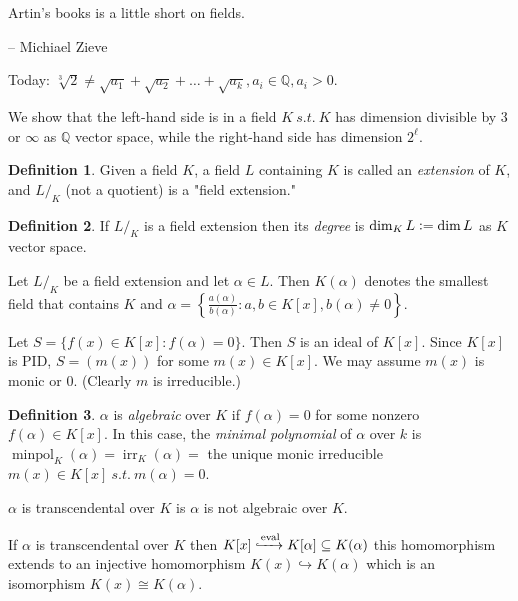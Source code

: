 \documentclass{article}
\newcommand{\Q}{\mathbb{Q}}
\newcommand{\st}{\ s.t.\ }
\newcommand{\defeq}{\vcentcolon=}
\theoremstyle{definition}
\newtheorem*{definition}{Definition}
\theoremstyle{remark}
\begin{document}

\epigraph{Artin's books is a little short on fields.}{-- \textup{Michiael Zieve}}

Today: $\sqrt[3]{2} \neq \sqrt{a_1} + \sqrt{a_2} + \ldots + \sqrt{a_k}, a_i \in \Q, a_i > 0$.

We show that the left-hand side is in a field $K \st K$ has dimension divisible by $3$ or $\infty$ as $\Q$ vector space, while the right-hand side has dimension $2^\ell$.

\begin{definition}
  Given a field $K$, a field $L$ containing $K$ is called an \emph{extension} of $K$, and $L/_K$ (not a quotient) is a "field extension."
\end{definition}

\begin{definition}
  If $L/_K$ is a field extension then its \emph{degree} is $\dim_KL \defeq \dim L$ as $K$ vector space.
\end{definition}

Let $L/_K$ be a field extension and let $\alpha \in L$. Then $K(\alpha)$ denotes the smallest field that contains $K$ and $\alpha = \left\lbrace \frac{a(\alpha)}{b(\alpha)}: a, b \in K[x], b(\alpha) \neq 0\right\rbrace$.

Let $S = \{f(x) \in K[x]: f(\alpha) = 0\}$. Then $S$ is an ideal of $K[x]$. Since $K[x]$ is PID, $S = (m(x))$ for some $m(x) \in K[x]$. We may assume $m(x)$ is monic or $0$. (Clearly $m$ is irreducible.)

\begin{definition}
  $\alpha$ is \emph{algebraic} over $K$ if $f(\alpha) = 0$ for some nonzero $f(\alpha) \in K[x]$. In this case, the \emph{minimal polynomial} of $\alpha$ over $k$ is $\operatorname{minpol}_K(\alpha) = \operatorname{irr}_K(\alpha) =$ the unique monic irreducible $m(x) \in K[x] \st m(\alpha) = 0$.

  $\alpha$ is transcendental over $K$ is $\alpha$ is not algebraic over $K$.
\end{definition}

If $\alpha$ is transcendental over $K$ then $K[x] \xhookrightarrow[]{\text{eval}} K[\alpha] \subseteq K(\alpha)$ this homomorphism extends to an injective homomorphism $K(x) \hookrightarrow K(\alpha)$ which is an isomorphism $K(x) \cong K(\alpha)$.
\end{document}
